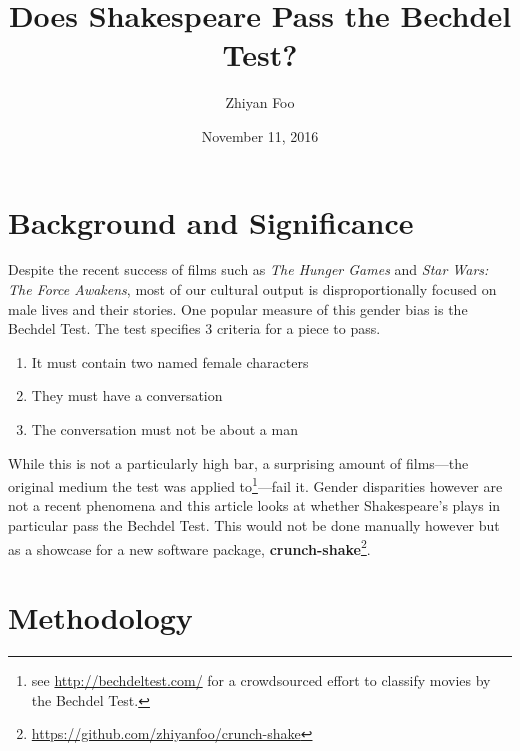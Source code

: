 \documentclass[12pt]{article}
\begin{document}
\title{Does Shakespeare Pass the Bechdel Test?}
\date{November 11, 2016}
\author{Zhiyan Foo}
\maketitle

\section{Background and Significance}
\label{sec:background_and_significance}

Despite the recent success of films such as \emph{The Hunger Games} and \emph{Star
Wars: The Force Awakens}, most of our cultural output is disproportionally
focused on male lives and their stories\cite{atlantic}. One popular measure of this gender
bias is the Bechdel Test\cite{polygraph}. The test specifies 3 criteria for a piece to pass. 
\begin{enumerate}  
\item It must contain two named female characters
\item They must have a conversation
\item The conversation must not be about a man
\end{enumerate}
While this is not a particularly high bar, a surprising amount of films---the
original medium the test was applied to\footnote{see
\url{http://bechdeltest.com/} for a crowdsourced effort to classify movies by
the Bechdel Test.}---fail it. Gender disparities however are not a recent
phenomena and this article looks at whether Shakespeare's plays in particular
pass the Bechdel Test. This would not be done manually however but as a
showcase for a new software package,
\textbf{crunch-shake}\footnote{\url{https://github.com/zhiyanfoo/crunch-shake}}.

\section{Methodology}
\label{sec:methodology}
\end{document}
